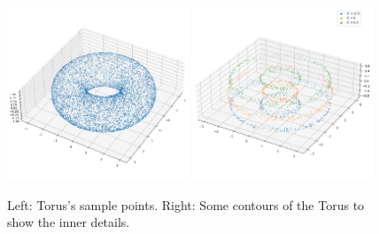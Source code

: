 \begin{homeworkProblem}
\begin{figure}[ht]
    \centering
    \includegraphics[width=0.48\textwidth]{./figure/p7/d_sample.png}
    \includegraphics[width=0.48\textwidth]{./figure/p7/d_contour.png}
    \caption{Left: Torus's sample points. Right: Some contours of the Torus to show the inner details.}
\end{figure}

\end{homeworkProblem}

\newpage